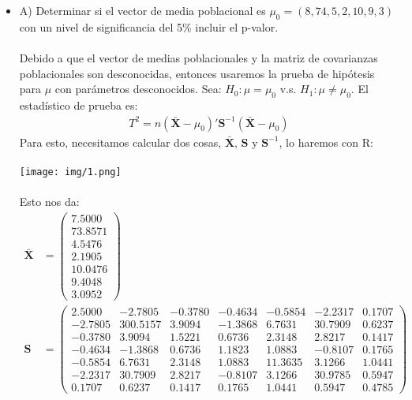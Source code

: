 \begin{sol}
\begin{itemize}
\item A) Determinar si el vector de media poblacional es $\mu_0=(8,74,5,2,10,9,3)$ con un nivel
de significancia del 5\% incluir el p-valor.\\\\
Debido a que el vector de medias poblacionales y la matriz de covarianzas poblacionales son desconocidas, entonces usaremos la prueba de hipótesis para $\mu$ con parámetros desconocidos. Sea:
$H_0:\mu = \mu_0 $ v.s. $H_1:\mu \neq \mu_0$.
El estadístico de prueba es:
\begin{align*}
T^2=n(\bar{\mathbf{X}} - \mu_0)'\mathbf{S}^{-1}(\mathbf{\bar{X}}-\mu_0)
\end{align*}
Para esto, necesitamos calcular dos cosas, $\mathbf{\bar{X}}$, $\mathbf{S}$ y $\mathbf{S}^{-1}$, lo haremos con R:\\\\
\texttt{[image: img/1.png]}\\\\
Esto nos da:
\begin{align*}
\mathbf{\bar{X}} &= \begin{pmatrix}
  7.5000 \\
  73.8571 \\
  4.5476 \\
  2.1905 \\
  10.0476 \\
  9.4048 \\
  3.0952
\end{pmatrix}\\
\mathbf{S} &= \begin{pmatrix}
  2.5000 & -2.7805 & -0.3780 & -0.4634 & -0.5854 & -2.2317 &  0.1707 \\
 -2.7805 & 300.5157 &  3.9094 & -1.3868 &  6.7631 & 30.7909 &  0.6237 \\
 -0.3780 &   3.9094 &  1.5221 &  0.6736 &  2.3148 &  2.8217 &  0.1417 \\
 -0.4634 &  -1.3868 &  0.6736 &  1.1823 &  1.0883 & -0.8107 &  0.1765 \\
 -0.5854 &   6.7631 &  2.3148 &  1.0883 & 11.3635 &  3.1266 &  1.0441 \\
 -2.2317 &  30.7909 &  2.8217 & -0.8107 &  3.1266 & 30.9785 &  0.5947 \\
  0.1707 &   0.6237 &  0.1417 &  0.1765 &  1.0441 &  0.5947 &  0.4785
\end{pmatrix} \\

\end{align*}
\end{itemize}
\end{sol}
